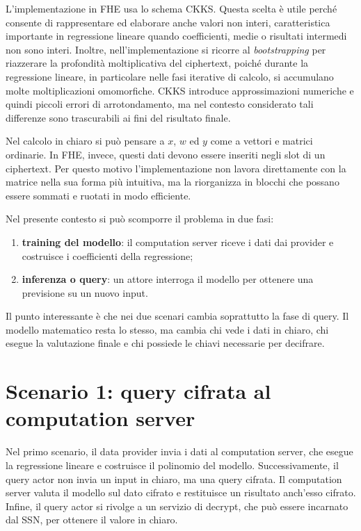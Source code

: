 L'implementazione in FHE usa lo schema CKKS. Questa scelta \`e utile perch\'e consente di rappresentare ed elaborare anche valori non interi, caratteristica importante in regressione lineare quando coefficienti, medie o risultati intermedi non sono interi. Inoltre, nell'implementazione si ricorre al \emph{bootstrapping} per riazzerare la profondit\`a moltiplicativa del ciphertext, poich\'e durante la regressione lineare, in particolare nelle fasi iterative di calcolo, si accumulano molte moltiplicazioni omomorfiche. CKKS introduce approssimazioni numeriche e quindi piccoli errori di arrotondamento, ma nel contesto considerato tali differenze sono trascurabili ai fini del risultato finale.

Nel calcolo in chiaro si pu\`o pensare a $x$, $w$ ed $y$ come a vettori e matrici ordinarie. In FHE, invece, questi dati devono essere inseriti negli slot di un ciphertext. Per questo motivo l'implementazione non lavora direttamente con la matrice nella sua forma pi\`u intuitiva, ma la riorganizza in blocchi che possano essere sommati e ruotati in modo efficiente.

Nel presente contesto si pu\`o scomporre il problema in due fasi:
\begin{enumerate}
  \item \textbf{training del modello}: il computation server riceve i dati dai provider e costruisce i coefficienti della regressione;
  \item \textbf{inferenza o query}: un attore interroga il modello per ottenere una previsione su un nuovo input.
\end{enumerate}

Il punto interessante \`e che nei due scenari cambia soprattutto la fase di query. Il modello matematico resta lo stesso, ma cambia chi vede i dati in chiaro, chi esegue la valutazione finale e chi possiede le chiavi necessarie per decifrare.

\section{Scenario 1: query cifrata al computation server}
Nel primo scenario, il data provider invia i dati al computation server, che esegue la regressione lineare e costruisce il polinomio del modello. Successivamente, il query actor non invia un input in chiaro, ma una query cifrata. Il computation server valuta il modello sul dato cifrato e restituisce un risultato anch'esso cifrato. Infine, il query actor si rivolge a un servizio di decrypt, che pu\`o essere incarnato dal SSN, per ottenere il valore in chiaro.

